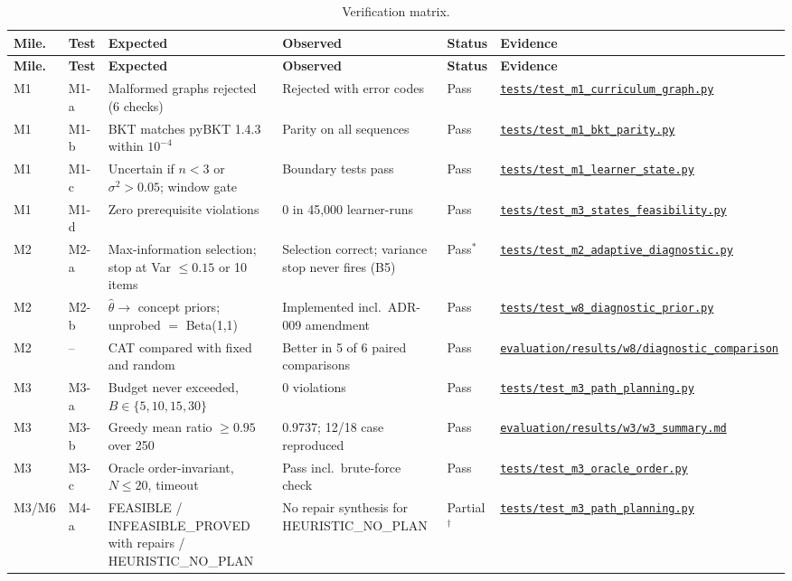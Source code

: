 \documentclass[english]{sintr}
\newcommand{\repourl}{https://github.com/Bhuvan-56/adaptive-learning-path-planner-DAT}
\newcommand{\sha}{cs5903-final-2026}
\DeclareRobustCommand{\rf}[1]{\href{\repourl/blob/\sha/#1}{\nolinkurl{#1}}}
\DeclareRobustCommand{\rd}[1]{\href{\repourl/tree/\sha/#1}{\nolinkurl{#1}}}
\begin{document}
{\small
\begin{longtable}{|C{1.12cm}|C{0.87cm}|L{3.65cm}|L{3.47cm}|C{1.13cm}|L{3.65cm}|}
\caption{Verification matrix.}\\
\hline
\textbf{Mile.} & \textbf{Test} & \textbf{Expected} & \textbf{Observed} & \textbf{Status} & \textbf{Evidence} \\ \hline
\endfirsthead
\hline \textbf{Mile.} & \textbf{Test} & \textbf{Expected} & \textbf{Observed} & \textbf{Status} & \textbf{Evidence} \\ \hline
\endhead
M1 & M1-a & Malformed graphs rejected (6 checks) & Rejected with error codes & Pass & \rf{tests/test_m1_curriculum_graph.py} \\ \hline
M1 & M1-b & BKT matches pyBKT 1.4.3 within $10^{-4}$ & Parity on all sequences & Pass & \rf{tests/test_m1_bkt_parity.py} \\ \hline
M1 & M1-c & Uncertain if $n<3$ or $\sigma^2>0.05$; window gate & Boundary tests pass & Pass & \rf{tests/test_m1_learner_state.py} \\ \hline
M1 & M1-d & Zero prerequisite violations & 0 in 45,000 learner-runs & Pass & \rf{tests/test_m3_states_feasibility.py} \\ \hline
M2 & M2-a & Max-information selection; stop at Var $\leq 0.15$ or 10 items & Selection correct; variance stop never fires (B5) & Pass$^*$ & \rf{tests/test_m2_adaptive_diagnostic.py} \\ \hline
M2 & M2-b & $\hat\theta \rightarrow$ concept priors; unprobed $=$ Beta(1,1) & Implemented incl.\ ADR-009 amendment & Pass & \rf{tests/test_w8_diagnostic_prior.py} \\ \hline
M2 & -- & CAT compared with fixed and random & Better in 5 of 6 paired comparisons & Pass & \rd{evaluation/results/w8/diagnostic_comparison} \\ \hline
M3 & M3-a & Budget never exceeded, $B\in\{5,10,15,30\}$ & 0 violations & Pass & \rf{tests/test_m3_path_planning.py} \\ \hline
M3 & M3-b & Greedy mean ratio $\geq 0.95$ over 250 & 0.9737; 12/18 case reproduced & Pass & \rf{evaluation/results/w3/w3_summary.md} \\ \hline
M3 & M3-c & Oracle order-invariant, $N\leq 20$, timeout & Pass incl.\ brute-force check & Pass & \rf{tests/test_m3_oracle_order.py} \\ \hline
M3/M6 & M4-a & FEASIBLE / INFEASIBLE\_\allowbreak PROVED with repairs / HEURISTIC\_\allowbreak NO\_\allowbreak PLAN & No repair synthesis for HEURISTIC\_\allowbreak NO\_\allowbreak PLAN & Partial$^\dagger$ & \rf{tests/test_m3_path_planning.py} \\ \hline

\end{longtable}}
\end{document}
